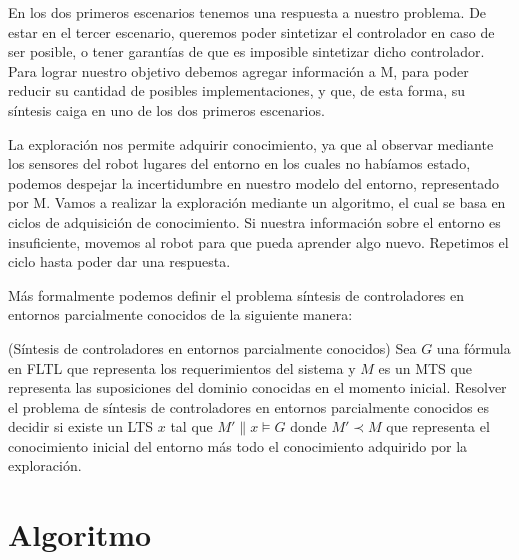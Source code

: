 En los dos primeros escenarios tenemos una respuesta a nuestro problema. De estar en el tercer escenario, queremos poder sintetizar 
el controlador en caso de ser posible, o tener garantías de que es imposible sintetizar dicho controlador. Para lograr nuestro objetivo 
debemos agregar información a M, para poder reducir su cantidad de posibles implementaciones, y que, de esta forma, su síntesis caiga 
en uno de los dos primeros escenarios.

La exploración nos permite adquirir conocimiento, ya que al observar mediante los sensores del robot lugares del entorno en los cuales 
no habíamos estado, podemos despejar la incertidumbre en nuestro modelo del entorno, representado por M. Vamos a realizar la exploración 
mediante un algoritmo, el cual se basa en ciclos de adquisición de conocimiento. Si nuestra información sobre el entorno es insuficiente, 
movemos al robot para que pueda aprender algo nuevo. Repetimos el ciclo hasta poder dar una respuesta.

Más formalmente podemos definir el problema síntesis de controladores en entornos parcialmente conocidos de la siguiente manera:

\begin{definition}{(Síntesis de controladores en entornos parcialmente conocidos)}
Sea $G$ una fórmula en FLTL que representa los requerimientos del sistema y $M$ es un MTS que representa las suposiciones del dominio conocidas en el momento inicial. Resolver el problema de síntesis de controladores en entornos parcialmente conocidos es decidir si existe un LTS $x$ tal que $M' \| x \models G$ donde $M' \prec M$ que representa el conocimiento inicial del entorno más todo el conocimiento adquirido por la exploración.
\end{definition}

\section{Algoritmo}

